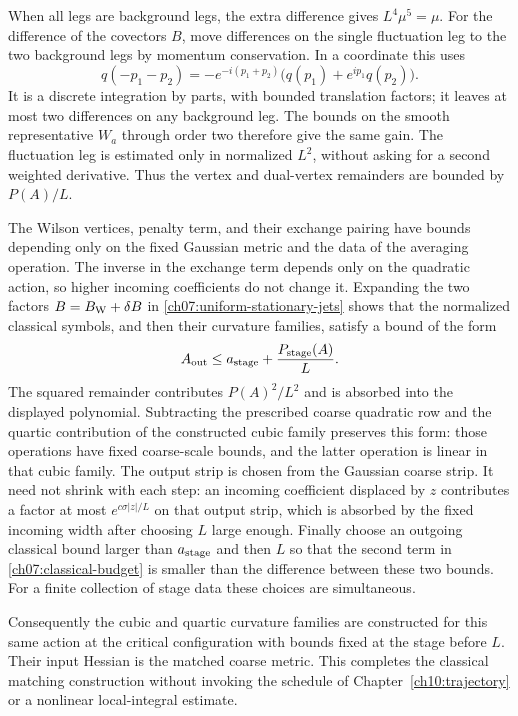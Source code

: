 When all legs are background legs, the extra difference gives $L^4\mu^5=\mu$.
For the difference of the covectors $B$, move differences on the single
fluctuation leg to the two background legs by momentum conservation. In a
coordinate this uses
\[
 q(-p_1-p_2)=-e^{-i(p_1+p_2)}
                \bigl(q(p_1)+e^{ip_1}q(p_2)\bigr).
\]
It is a discrete integration by parts, with bounded translation factors;
it leaves at most two differences on any background leg. The
bounds on the smooth representative $W_a$ through order two therefore give the same gain.
The fluctuation leg is estimated only in normalized $L^2$, without asking
for a second weighted derivative. Thus the vertex and dual-vertex
remainders are bounded by $P(A)/L$.

The Wilson vertices, penalty term, and their exchange pairing have
bounds depending only on the fixed Gaussian metric and the data of the averaging operation.
The inverse in the exchange term depends only on the quadratic action,
so higher incoming coefficients do not change it. Expanding the two
factors $B=B_{\rm W}+\delta B$ in
\eqref{ch07:uniform-stationary-jets} shows that the normalized classical
symbols, and then their curvature families, satisfy a bound of the form
\begin{equation}\label{ch07:classical-budget}
             A_{\rm out}\le a_{\rm stage}+\frac{P_{\rm stage}(A)}{L}.
\end{equation}
The squared remainder contributes $P(A)^2/L^2$ and is absorbed into the displayed
polynomial. Subtracting the prescribed coarse quadratic row and the
quartic contribution of the constructed cubic family preserves this
form: those operations have fixed coarse-scale bounds, and the latter
operation is linear in that cubic family.
The output strip is chosen from the Gaussian coarse strip. It need not
shrink with each step: an incoming coefficient displaced by $z$ contributes a factor
at most $e^{c\sigma|z|/L}$ on that output strip, which is absorbed by the
fixed incoming width after choosing $L$ large enough. Finally choose an
outgoing classical bound larger than $a_{\rm stage}$ and then $L$
so that the second term in \eqref{ch07:classical-budget} is smaller than the difference between these two bounds.
For a finite collection of stage data these choices are simultaneous.

Consequently the cubic and quartic curvature families are constructed
for this same action at the critical configuration with bounds fixed at the stage before
$L$. Their input Hessian is the matched coarse metric.
This completes the classical matching construction without invoking the schedule of Chapter~\ref{ch10:trajectory}
or a nonlinear local-integral estimate.

